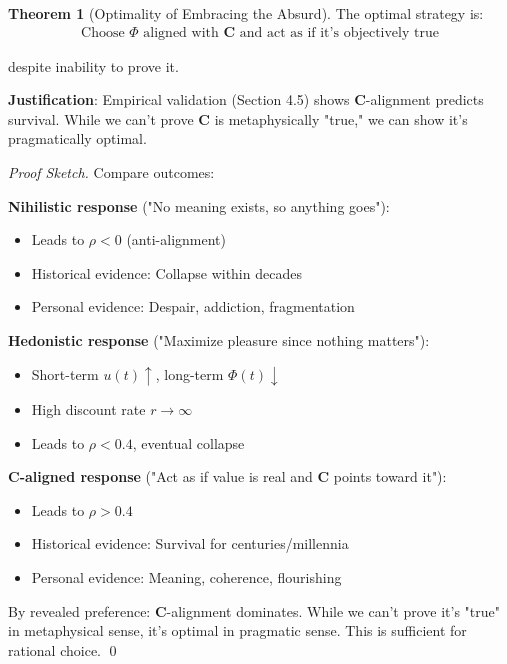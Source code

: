 \documentclass[11pt,a4paper]{article}
\theoremstyle{definition}
\newtheorem{theorem}{Theorem}[section]
\theoremstyle{remark}
\begin{document}
\begin{enumerate}
\begin{theorem}[Optimality of Embracing the Absurd]
The optimal strategy is:
\begin{align}
\text{Choose } \Phi \text{ aligned with } \mathbf{C} \text{ and act as if it's objectively true}
\end{align}

despite inability to prove it.

\textbf{Justification}: Empirical validation (Section 4.5) shows \(\mathbf{C}\)-alignment predicts survival. While we can't prove \(\mathbf{C}\) is metaphysically "true," we can show it's pragmatically optimal.
\end{theorem}

\begin{proof}[Proof Sketch]
Compare outcomes:

\textbf{Nihilistic response} ("No meaning exists, so anything goes"):
\begin{itemize}
    \item Leads to \(\rho < 0\) (anti-alignment)
    \item Historical evidence: Collapse within decades
    \item Personal evidence: Despair, addiction, fragmentation
\end{itemize}

\textbf{Hedonistic response} ("Maximize pleasure since nothing matters"):
\begin{itemize}
    \item Short-term \(u(t) \uparrow\), long-term \(\Phi(t) \downarrow\)
    \item High discount rate \(r \to \infty\)
    \item Leads to \(\rho < 0.4\), eventual collapse
\end{itemize}

\textbf{C-aligned response} ("Act as if value is real and \(\mathbf{C}\) points toward it"):
\begin{itemize}
    \item Leads to \(\rho > 0.4\)
    \item Historical evidence: Survival for centuries/millennia
    \item Personal evidence: Meaning, coherence, flourishing
\end{itemize}

By revealed preference: \(\mathbf{C}\)-alignment dominates. While we can't prove it's "true" in metaphysical sense, it's optimal in pragmatic sense. This is sufficient for rational choice. \qed
\end{proof}


\end{enumerate}
\end{document}
